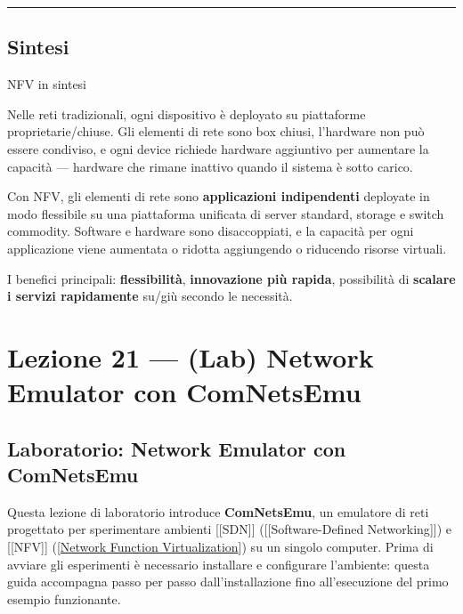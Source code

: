 \documentclass[
  italian,
  openany]{book}
\begin{document}
\begin{center}\rule{0.5\linewidth}{0.5pt}\end{center}

\section{Sintesi}\label{sintesi-1}

\begin{calloutnote}{NFV in sintesi}

Nelle reti tradizionali, ogni dispositivo è deployato su piattaforme
proprietarie/chiuse. Gli elementi di rete sono box chiusi, l'hardware
non può essere condiviso, e ogni device richiede hardware aggiuntivo per
aumentare la capacità --- hardware che rimane inattivo quando il sistema
è sotto carico.

Con NFV, gli elementi di rete sono \textbf{applicazioni indipendenti}
deployate in modo flessibile su una piattaforma unificata di server
standard, storage e switch commodity. Software e hardware sono
disaccoppiati, e la capacità per ogni applicazione viene aumentata o
ridotta aggiungendo o riducendo risorse virtuali.

I benefici principali: \textbf{flessibilità}, \textbf{innovazione più
rapida}, possibilità di \textbf{scalare i servizi rapidamente} su/giù
secondo le necessità.

\end{calloutnote}

\newpage

\chapter{Lezione 21 --- (Lab) Network Emulator con
ComNetsEmu}\label{lezione-21-lab-network-emulator-con-comnetsemu}

\section{Laboratorio: Network Emulator con
ComNetsEmu}\label{laboratorio-network-emulator-con-comnetsemu}

Questa lezione di laboratorio introduce \textbf{ComNetsEmu}, un
emulatore di reti progettato per sperimentare ambienti {[}{[}SDN{]}{]}
({[}{[}Software-Defined Networking{]}{]}) e {[}{[}NFV{]}{]}
({[}\hyperref[network-function-virtualization]{Network Function
Virtualization}{]}) su un singolo computer. Prima di avviare gli
esperimenti è necessario installare e configurare l'ambiente: questa
guida accompagna passo per passo dall'installazione fino all'esecuzione
del primo esempio funzionante.
\end{document}
